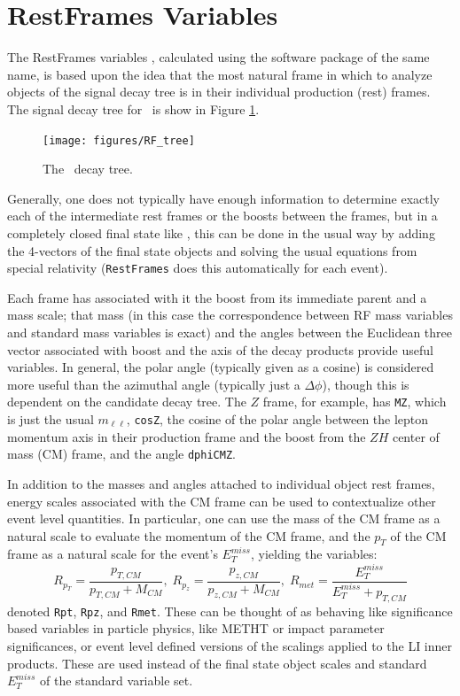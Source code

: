 \section{RestFrames Variables}
\label{sec:rf}
The RestFrames variables \cite{rjr}, calculated using the software package of the same name, is based upon the idea that the most natural frame in which to analyze objects of the signal decay tree is in their individual production (rest) frames.  The signal decay tree for \ZH\, is show in Figure \ref{fig:rftree}.
\begin{figure}[!htbp]\captionsetup{justification=centering}
  \centering
  \texttt{[image: figures/RF\_tree]}
  \caption{The \ZH\, decay tree.}
  \label{fig:rftree}
\end{figure}
Generally, one does not typically have enough information to determine exactly each of the intermediate rest frames or the boosts between the frames, but in a completely closed final state like \ZH, this can be done in the usual way by adding the 4-vectors of the final state objects and solving the usual equations from special relativity (\texttt{RestFrames} does this automatically for each event).

Each frame has associated with it the boost from its immediate parent and a mass scale; that mass (in this case the correspondence between RF mass variables and standard mass variables is exact) and the angles between the Euclidean three vector associated with boost and the axis of the decay products provide useful variables.  In general, the polar angle (typically given as a cosine) is considered more useful than the azimuthal angle (typically just a $\Delta\phi$), though this is dependent on the candidate decay tree.  The $Z$ frame, for example, has \texttt{MZ}, which is just the usual $m_{\ell\ell}$, \texttt{cosZ}, the cosine of the polar angle between the lepton momentum axis in their production frame and the boost from the $ZH$ center of mass (CM) frame, and the angle \texttt{dphiCMZ}.

In addition to the masses and angles attached to individual object rest frames, energy scales associated with the CM frame can be used to contextualize other event level quantities.  In particular, one can use the mass of the CM frame as a natural scale to evaluate the momentum of the CM frame, and the $p_T$ of the CM frame as a natural scale for the event's $E_T^{miss}$, yielding the variables:
\begin{equation}
\label{eqn:Rrjr}
R_{p_T} = \frac{p_{T,CM}}{p_{T,CM}+M_{CM}},\;R_{p_z} = \frac{p_{z,CM}}{p_{z,CM}+M_{CM}},\;R_{met} = \frac{E_T^{miss}}{E_T^{miss}+p_{T,CM}}
\end{equation}
denoted \texttt{Rpt}, \texttt{Rpz}, and \texttt{Rmet}.  These can be thought of as behaving like significance based variables in particle physics, like METHT or impact parameter significances, or event level defined versions of the scalings applied to the LI inner products.  These are used instead of the final state object scales and standard $E_T^{miss}$ of the standard variable set.

